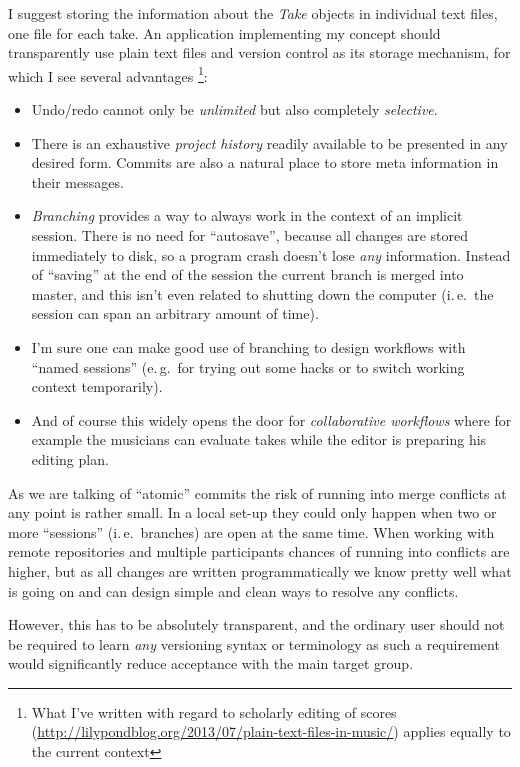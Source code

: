 \documentclass[11pt,a4paper]{article}
\begin{document}
I suggest storing the information about the \emph{Take} objects in individual
text files, one file for each take.
An application implementing my concept should transparently use plain text files
and version control as its storage mechanism, for which I see several
advantages%
\footnote{What I've written with regard to scholarly editing of scores
(\url{http://lilypondblog.org/2013/07/plain-text-files-in-music/}) applies
equally to the current context}:
\begin{itemize}
\item Undo/redo cannot only be \emph{unlimited} but also completely
\emph{selective}.
\item There is an exhaustive \emph{project history} readily available to be
presented in any desired form.
Commits are also a natural place to store meta information in their messages.
\item \emph{Branching} provides a way to always work in the context of an
implicit session.
There is no need for “autosave”, because all changes are stored immediately to
disk, so a program crash doesn't lose \emph{any} information.
Instead of “saving” at the end of the session the current branch is merged into
master, and this isn't even related to shutting down the computer (i.\,e.\ the session can span an arbitrary amount of time).
\item I'm sure one can make good use of branching to design workflows with
“named sessions” (e.\,g.\ for trying out some hacks or to switch working context
temporarily).
\item And of course this widely opens the door for \emph{collaborative
workflows} where for example the musicians can evaluate takes while the editor
is preparing his editing plan.
\end{itemize}

As we are talking of “atomic” commits the risk of running into merge conflicts
at any point is rather small.
In a local set-up they could only happen when two or more “sessions” (i.\,e.\
branches) are open at the same time.
When working with remote repositories and multiple participants chances of
running into conflicts are higher, but as all changes are written
programmatically we know pretty well what is going on and can design simple and
clean ways to resolve any conflicts.

However, this has to be absolutely transparent, and the ordinary user should not
be required to learn \emph{any} versioning syntax or terminology as
such a requirement would significantly reduce acceptance with the main target
group.
\end{document}
